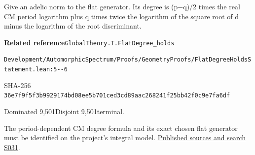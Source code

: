 
\begin{formalstatement}[D123]\label{decomp:D123}
Give an adelic norm to the flat generator. Its degree is (p\ensuremath{-}q)/2 times the real CM period logarithm plus q times twice the logarithm of the square root of d minus the logarithm of the root discriminant.
\end{formalstatement}
{\small\raggedright\noindent\textsf{\bfseries Related reference}\quad \nolinkurl{GlobalTheory.T.FlatDegree_holds}\par\noindent \nolinkurl{Development/AutomorphicSpectrum/Proofs/GeometryProofs/FlatDegreeHoldsStatement.lean:5--6}\par\noindent SHA-256 \nolinkurl{36e7f9f5f3b9929174bd08ee5b701ced3cd89aac268241f25bb42f0c9e7fa6df}\par\noindent Dominated 9,501\quad Disjoint 9,501\quad terminal.\par}
The period-dependent CM degree formula and its exact chosen flat generator must be identified on the project’s integral model.
\hyperref[lit:S031]{Published sources and search S031}.
